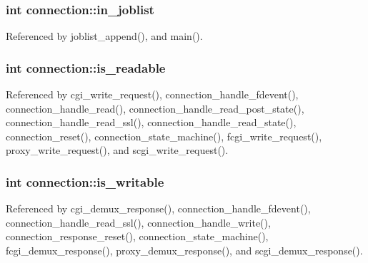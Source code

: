 \hypertarget{structconnection_a739dd4884f14ad354d8f0db35ae12efb}{
\subsubsection[{in\-\_\-joblist}]{\setlength{\rightskip}{0pt plus 5cm}int connection\-::in\-\_\-joblist}}\label{structconnection_a739dd4884f14ad354d8f0db35ae12efb}


Referenced by joblist\-\_\-append(), and main().

\hypertarget{structconnection_a4356ba50972fa86e3b1852bee2486192}{
\subsubsection[{is\-\_\-readable}]{\setlength{\rightskip}{0pt plus 5cm}int connection\-::is\-\_\-readable}}\label{structconnection_a4356ba50972fa86e3b1852bee2486192}


Referenced by cgi\-\_\-write\-\_\-request(), connection\-\_\-handle\-\_\-fdevent(), connection\-\_\-handle\-\_\-read(), connection\-\_\-handle\-\_\-read\-\_\-post\-\_\-state(), connection\-\_\-handle\-\_\-read\-\_\-ssl(), connection\-\_\-handle\-\_\-read\-\_\-state(), connection\-\_\-reset(), connection\-\_\-state\-\_\-machine(), fcgi\-\_\-write\-\_\-request(), proxy\-\_\-write\-\_\-request(), and scgi\-\_\-write\-\_\-request().

\hypertarget{structconnection_af60569b593cb548343b58ff650d57486}{
\subsubsection[{is\-\_\-writable}]{\setlength{\rightskip}{0pt plus 5cm}int connection\-::is\-\_\-writable}}\label{structconnection_af60569b593cb548343b58ff650d57486}


Referenced by cgi\-\_\-demux\-\_\-response(), connection\-\_\-handle\-\_\-fdevent(), connection\-\_\-handle\-\_\-read\-\_\-ssl(), connection\-\_\-handle\-\_\-write(), connection\-\_\-response\-\_\-reset(), connection\-\_\-state\-\_\-machine(), fcgi\-\_\-demux\-\_\-response(), proxy\-\_\-demux\-\_\-response(), and scgi\-\_\-demux\-\_\-response().

